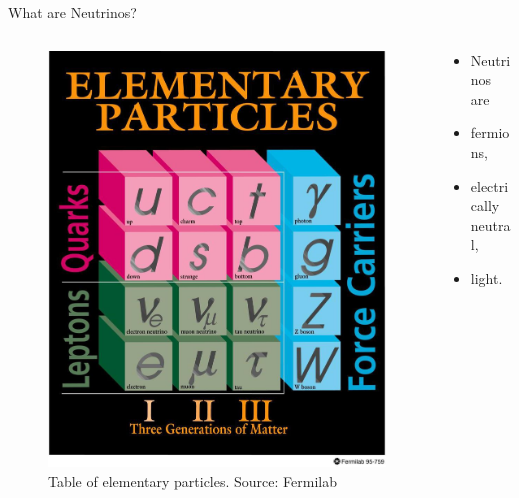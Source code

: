 \documentclass[9pt]{beamer}
\begin{document}
\begin{darkframes}
\begin{frame}{What are Neutrinos?}
\begin{minipage}[\textheight]{\textwidth}
\begin{columns}[T]

\begin{column}{0.6\textwidth}
\begin{figure}
\includegraphics[width=0.9\linewidth,height=0.7\textheight,keepaspectratio]{assets/elementary-particles.jpg}
\caption*{Table of elementary particles. Source: Fermilab} %
\end{figure}
\end{column}

\begin{column}{0.4\textwidth}


    \begin{itemize}
    \item[] Neutrinos are
    \item fermions,
    \item electrically neutral,
    \item light.
    \end{itemize}




\end{column}
\end{columns}
\end{minipage}
\end{frame}
\end{darkframes}
\end{document}
